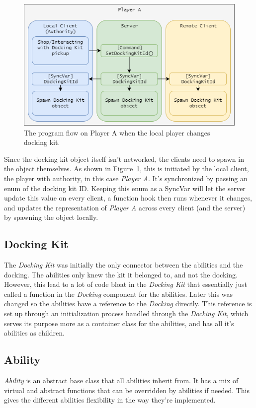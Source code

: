 \begin{figure}[tbph]
  \centering
  \includegraphics[width=.9\textwidth]{images/CommandSetDockingKit}
  \caption[Program flow on changing docking kit]{The program flow on Player A when the local player changes docking kit.}
  \label{fig:commandSetDockingKit}
\end{figure}

Since the docking kit object itself isn't networked, the clients need to spawn in the object themselves. As shown in Figure~\ref{fig:commandSetDockingKit}, this is initiated by the local client, the player with authority, in this case \emph{Player A}. It's synchronized by passing an enum of the docking kit ID. Keeping this enum as a SyncVar will let the server update this value on every client, a function hook then runs whenever it changes, and updates the representation of \emph{Player A} across every client (and the server) by spawning the object locally.

\subsection{Docking Kit}
The \emph{Docking Kit} was initially the only connector between the abilities and the docking. The abilities only knew the kit it belonged to, and not the docking. However, this lead to a lot of code bloat in the \emph{Docking Kit} that essentially just called a function in the \emph{Docking} component for the abilities. Later this was changed so the abilities have a reference to the \emph{Docking} directly. This reference is set up through an initialization process handled through the \emph{Docking Kit}, which serves its purpose more as a container class for the abilities, and has all it's abilities as children. 

\subsection{Ability}
\emph{Ability} is an abstract base class that all abilities inherit from. It has a mix of virtual and abstract functions that can be overridden by abilities if needed. This gives the different abilities flexibility in the way they're implemented. 

